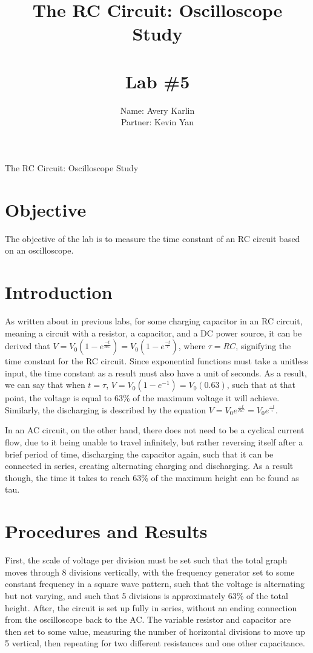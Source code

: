 \documentclass[11pt, titlepage]{article}
\title{The RC Circuit: Oscilloscope Study \\ \ \\ \large Lab \#5}
\author{Name: Avery Karlin \\ Partner: Kevin Yan}
\date{}
\begin{document}
\maketitle

\begin{center}
\LARGE The RC Circuit: Oscilloscope Study
\end{center}

\section*{Objective}
The objective of the lab is to measure the time constant of an RC circuit based on an oscilloscope.

\section*{Introduction}
As written about in previous labs, for some charging capacitor in an RC circuit, meaning a circuit with a resistor, a capacitor, and a DC power source, it can be derived that $V = V_0(1 - e^{\frac{-t}{RC}}) = V_0(1 - e^{\frac{-t}{\tau}})$, where $\tau = RC$, signifying the time constant for the RC circuit. Since exponential functions must take a unitless input, the time constant as a result must also have a unit of seconds. As a result, we can say that when $t = \tau$, $V = V_0(1 - e^{-1}) = V_0(0.63)$, such that at that point, the voltage is equal to 63\% of the maximum voltage it will achieve. Similarly, the discharging is described by the equation $V = V_0e^{\frac{-t}{RC}} = V_0e^{\frac{-t}{\tau}}$.

In an AC circuit, on the other hand, there does not need to be a cyclical current flow, due to it being unable to travel infinitely, but rather reversing itself after a brief period of time, discharging the capacitor again, such that it can be connected in series, creating alternating charging and discharging. As a result though, the time it takes to reach 63\% of the maximum height can be found as tau.

\section*{Procedures and Results}

First, the scale of voltage per division must be set such that the total graph moves through 8 divisions vertically, with the frequency generator set to some constant frequency in a square wave pattern, such that the voltage is alternating but not varying, and such that 5 divisions is approximately 63\% of the total height. After, the circuit is set up fully in series, without an ending connection from the oscilloscope back to the AC. The variable resistor and capacitor are then set to some value, measuring the number of horizontal divisions to move up 5 vertical, then repeating for two different resistances and one other capacitance. 
\end{document}
